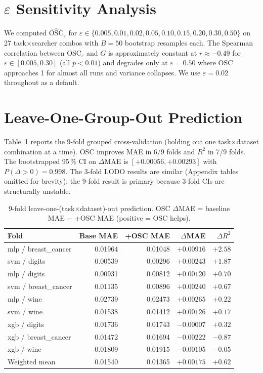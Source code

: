 \documentclass[twoside]{article}
\newcommand{\OSC}{\mathrm{OSC}}
\begin{document}
\section{$\varepsilon$ Sensitivity Analysis}
\label{app:eps}

We computed $\widehat{\OSC}_\varepsilon$ for $\varepsilon \in \{0.005,
0.01, 0.02, 0.05, 0.10, 0.15, 0.20, 0.30, 0.50\}$ on 27
task$\times$searcher combos with $B=50$ bootstrap resamples each.
The Spearman correlation between $\OSC_\varepsilon$ and $G$ is
approximately constant at $r \approx -0.49$ for $\varepsilon \in
[0.005, 0.30]$ (all $p < 0.01$) and degrades only at $\varepsilon =
0.50$ where OSC approaches 1 for almost all runs and variance collapses.
We use $\varepsilon = 0.02$ throughout as a default.

\section{Leave-One-Group-Out Prediction}
\label{app:cv}

Table~\ref{tab:cv} reports the 9-fold grouped cross-validation (holding
out one task$\times$dataset combination at a time). OSC improves MAE in
6/9 folds and $R^2$ in 7/9 folds. The bootstrapped 95\,\% CI on
$\Delta$MAE is $[+0.00056, +0.00293]$ with $P(\Delta > 0) = 0.998$.
The 3-fold LODO results are similar (Appendix tables omitted for
brevity); the 9-fold result is primary because 3-fold CIs are
structurally unstable.

\begin{table}[h]
\centering
\caption{9-fold leave-one-(task$\times$dataset)-out prediction.
OSC $\Delta$MAE = baseline MAE $-$ +OSC MAE (positive = OSC helps).}
\label{tab:cv}
\begin{tabular}{lrrrr}
\toprule
Fold & Base MAE & +OSC MAE & $\Delta$MAE & $\Delta R^2$ \\
\midrule
mlp / breast\_cancer   & 0.01964 & 0.01048 & $+0.00916$ & $+2.58$ \\
svm / digits           & 0.00539 & 0.00296 & $+0.00243$ & $+1.87$ \\
mlp / digits           & 0.00931 & 0.00812 & $+0.00120$ & $+0.70$ \\
svm / breast\_cancer   & 0.01135 & 0.00896 & $+0.00240$ & $+0.67$ \\
mlp / wine             & 0.02739 & 0.02473 & $+0.00265$ & $+0.22$ \\
svm / wine             & 0.01538 & 0.01412 & $+0.00126$ & $+0.17$ \\
xgb / digits           & 0.01736 & 0.01743 & $-0.00007$ & $+0.32$ \\
xgb / breast\_cancer   & 0.01472 & 0.01694 & $-0.00222$ & $-0.87$ \\
xgb / wine             & 0.01809 & 0.01915 & $-0.00105$ & $-0.05$ \\
\midrule
Weighted mean & 0.01540 & 0.01365 & $+0.00175$ & $+0.62$ \\
\bottomrule
\end{tabular}
\end{table}
\end{document}

